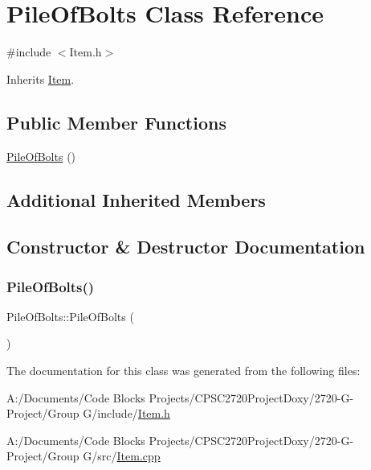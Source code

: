 \hypertarget{class_pile_of_bolts}{}\section{Pile\+Of\+Bolts Class Reference}
\label{class_pile_of_bolts}


{\ttfamily \#include $<$Item.\+h$>$}



Inherits \mbox{\hyperlink{class_item}{Item}}.

\subsection*{Public Member Functions}
\begin{DoxyCompactItemize}
\item 
\mbox{\hyperlink{class_pile_of_bolts_a919afae62fe29d87c998946732828f4e}{Pile\+Of\+Bolts}} ()
\end{DoxyCompactItemize}
\subsection*{Additional Inherited Members}


\subsection{Constructor \& Destructor Documentation}
\mbox{\label{class_pile_of_bolts_a919afae62fe29d87c998946732828f4e}} 
\subsubsection{\texorpdfstring{Pile\+Of\+Bolts()}{PileOfBolts()}}
{\footnotesize\ttfamily Pile\+Of\+Bolts\+::\+Pile\+Of\+Bolts (\begin{DoxyParamCaption}{ }\end{DoxyParamCaption})}



The documentation for this class was generated from the following files\+:\begin{DoxyCompactItemize}
\item 
A\+:/\+Documents/\+Code Blocks Projects/\+C\+P\+S\+C2720\+Project\+Doxy/2720-\/\+G-\/\+Project/\+Group G/include/\mbox{\hyperlink{_item_8h}{Item.\+h}}\item 
A\+:/\+Documents/\+Code Blocks Projects/\+C\+P\+S\+C2720\+Project\+Doxy/2720-\/\+G-\/\+Project/\+Group G/src/\mbox{\hyperlink{_item_8cpp}{Item.\+cpp}}\end{DoxyCompactItemize}
